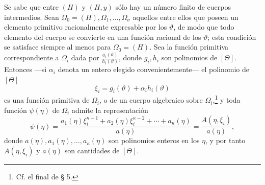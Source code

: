 Se sabe que entre $(H)$ y $(H,y)$ sólo hay un número finito de cuerpos intermedios. Sean $\Omega_0=(H),\Omega_1,\ldots,\Omega_\sigma$ aquellos entre ellos que poseen un elemento primitivo racionalmente expresable por los $\vartheta$, de modo que todo elemento del cuerpo se convierte en una función racional de los $\vartheta$; esta condición se satisface siempre al menos para $\Omega_0=(H)$. Sea la función primitiva correspondiente a $\Omega_i$ dada por $\frac{g_i(\vartheta)}{h_i(\vartheta)}$, donde $g_i,h_i$ son polinomios de $[\Theta]$. Entonces ---si $\alpha_i$ denota un entero elegido convenientemente--- el polinomio de $[\Theta]$
\[
 \xi_i=g_i(\vartheta)+\alpha_i h_i(\vartheta)
\]
es una función primitiva de $\Omega_i$, o de un cuerpo algebraico sobre $\Omega_i$,\footnote{Cf. el final de § 5.} y toda función $\psi(\eta)$ de $\Omega_i$ admite la representación
\begin{equation}
\psi(\eta)=
\frac{a_1(\eta)\xi_i^{\kappa-1}+a_2(\eta)\xi_i^{\kappa-2}+\cdots+a_\kappa(\eta)}
     {a(\eta)}
=\frac{A(\eta,\xi_i)}{a(\eta)},
\tag{2}
\end{equation}
donde $a(\eta),a_1(\eta),\ldots,a_\kappa(\eta)$ son polinomios enteros en los $\eta$, y por tanto $A(\eta,\xi_i)$ y $a(\eta)$ son cantidades de $[\Theta]$.

